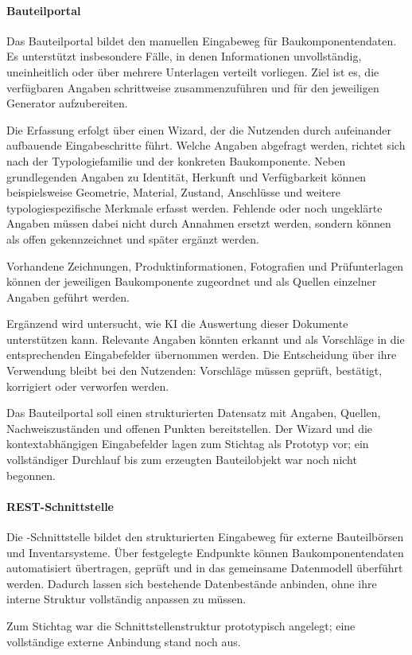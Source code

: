 \documentclass[type=zwischenbericht,theme=dark]{zukunftbau}
\begin{document}
\begin{SemioNest}
\paragraph{Bauteilportal}
Das Bauteilportal bildet den manuellen Eingabeweg für Baukomponentendaten. Es unterstützt insbesondere Fälle, in denen Informationen unvollständig, uneinheitlich oder über mehrere Unterlagen verteilt vorliegen. Ziel ist es, die verfügbaren Angaben schrittweise zusammenzuführen und für den jeweiligen Generator aufzubereiten.

Die Erfassung erfolgt über einen Wizard, der die Nutzenden durch aufeinander aufbauende Eingabeschritte führt. Welche Angaben abgefragt werden, richtet sich nach der Typologiefamilie und der konkreten Baukomponente. Neben grundlegenden Angaben zu Identität, Herkunft und Verfügbarkeit können beispielsweise Geometrie, Material, Zustand, Anschlüsse und weitere typologiespezifische Merkmale erfasst werden. Fehlende oder noch ungeklärte Angaben müssen dabei nicht durch Annahmen ersetzt werden, sondern können als offen gekennzeichnet und später ergänzt werden.

Vorhandene Zeichnungen, Produktinformationen, Fotografien und Prüfunterlagen können der jeweiligen Baukomponente zugeordnet und als Quellen einzelner Angaben geführt werden.

Ergänzend wird untersucht, wie KI die Auswertung dieser Dokumente unterstützen kann. Relevante Angaben könnten erkannt und als Vorschläge in die entsprechenden Eingabefelder übernommen werden. Die Entscheidung über ihre Verwendung bleibt bei den Nutzenden: Vorschläge müssen geprüft, bestätigt, korrigiert oder verworfen werden.

Das Bauteilportal soll einen strukturierten Datensatz mit Angaben, Quellen, Nachweiszuständen und offenen Punkten bereitstellen. Der Wizard und die kontextabhängigen Eingabefelder lagen zum Stichtag als Prototyp vor; ein vollständiger Durchlauf bis zum erzeugten Bauteilobjekt war noch nicht begonnen.

\paragraph{REST-Schnittstelle}
Die -Schnittstelle bildet den strukturierten Eingabeweg für externe Bauteilbörsen und Inventarsysteme. Über festgelegte Endpunkte können Baukomponentendaten automatisiert übertragen, geprüft und in das gemeinsame Datenmodell überführt werden. Dadurch lassen sich bestehende Datenbestände anbinden, ohne ihre interne Struktur vollständig anpassen zu müssen.

Zum Stichtag war die Schnittstellenstruktur prototypisch angelegt; eine vollständige externe Anbindung stand noch aus.
\end{SemioNest}
\end{document}
